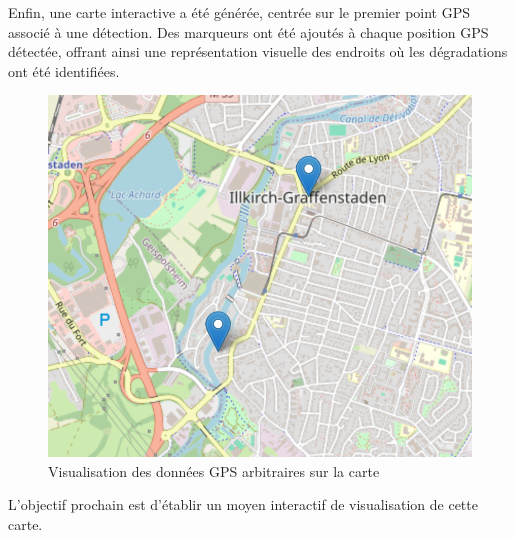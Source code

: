 Enfin, une carte interactive a été générée, centrée sur le premier point GPS associé à une détection. Des marqueurs ont été ajoutés à chaque position GPS détectée, offrant ainsi une représentation visuelle des endroits où les dégradations ont été identifiées.\\

\begin{figure}[H]
    \centering
    \includegraphics[width=0.5\linewidth]{img/gps_test_illkirch.png}
    \caption{Visualisation des données GPS arbitraires sur la carte}
\end{figure}

L'objectif prochain est d'établir un moyen interactif de visualisation de cette carte.